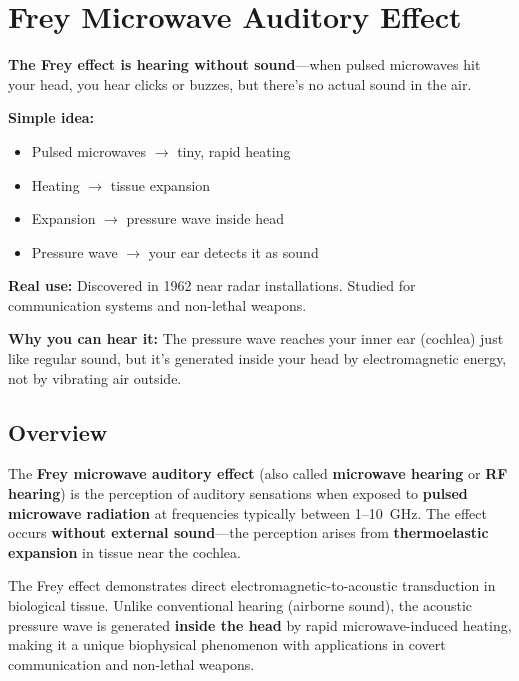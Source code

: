\chapter{Frey Microwave Auditory Effect}
\label{ch:frey-microwave-auditory-effect}

\begin{nontechnical}
\textbf{The Frey effect is hearing without sound}---when pulsed microwaves hit your head, you hear clicks or buzzes, but there's no actual sound in the air.

\textbf{Simple idea:}
\begin{itemize}
\item Pulsed microwaves $\rightarrow$ tiny, rapid heating
\item Heating $\rightarrow$ tissue expansion
\item Expansion $\rightarrow$ pressure wave inside head
\item Pressure wave $\rightarrow$ your ear detects it as sound
\end{itemize}

\textbf{Real use:} Discovered in 1962 near radar installations. Studied for communication systems and non-lethal weapons.

\textbf{Why you can hear it:} The pressure wave reaches your inner ear (cochlea) just like regular sound, but it's generated inside your head by electromagnetic energy, not by vibrating air outside.
\end{nontechnical}

\section{Overview}

The \textbf{Frey microwave auditory effect} (also called \textbf{microwave hearing} or \textbf{RF hearing}) is the perception of auditory sensations when exposed to \textbf{pulsed microwave radiation} at frequencies typically between 1--10~GHz. The effect occurs \textbf{without external sound}---the perception arises from \textbf{thermoelastic expansion} in tissue near the cochlea.

\begin{keyconcept}
The Frey effect demonstrates direct electromagnetic-to-acoustic transduction in biological tissue. Unlike conventional hearing (airborne sound), the acoustic pressure wave is generated \textbf{inside the head} by rapid microwave-induced heating, making it a unique biophysical phenomenon with applications in covert communication and non-lethal weapons.
\end{keyconcept}

